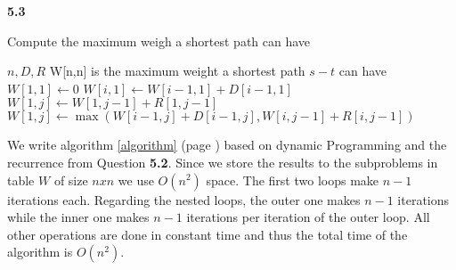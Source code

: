 \documentclass[11pt]{article}
\begin{document}
\noindent
\textbf{5.3}

\begin{algorithm}
\caption{Compute the maximum weigh a shortest path can have}
\label{algorithm}
\begin{algorithmic}
    \Require $n, D, R$
    \Ensure W[n,n] is the maximum weight a shortest path $s-t$ can have
    \State $W[1,1] \gets 0$
    \State $W[i,1] \gets W[i-1,1] + D[i-1,1]$
    \EndFor
    \State $W[1,j] \gets W[1,j-1] + R[1,j-1]$
    \EndFor
    \State $W[1,j] \gets \max(W[i-1, j] + D[i-1,j], W[i,j-1] + R[i,j-1])$
    \EndFor
    \EndFor
\end{algorithmic}
\end{algorithm}

We write algorithm \ref{algorithm} (page \pageref{algorithm}) based on
dynamic Programming and the recurrence from Question \textbf{5.2}.
Since we store the results to the subproblems in table $W$ of size
$ n x n $ we use $O(n^2)$ space.
The first two loops make $n - 1$ iterations each.
Regarding the nested loops, the outer one makes $n - 1$ iterations
while the inner one makes $n - 1$ iterations per iteration of the
outer loop. All other operations are done in constant time and thus the
total time of the algorithm is $O(n^2)$.
\end{document}
